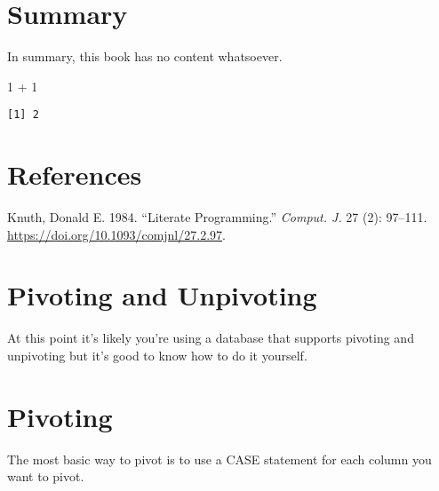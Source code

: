 \documentclass[
  letterpaper,
  DIV=11,
  numbers=noendperiod]{scrreprt}
\newenvironment{Shaded}{\begin{snugshade}}{\end{snugshade}}
\newcommand{\DecValTok}[1]{\textcolor[rgb]{0.68,0.00,0.00}{#1}}
\newcommand{\SpecialCharTok}[1]{\textcolor[rgb]{0.37,0.37,0.37}{#1}}
\newlength{\cslhangindent}
\newlength{\cslentryspacingunit} %
\newenvironment{CSLReferences}[2] %
 {%
  \setlength{\parindent}{0pt}
  \ifodd #1
  \let\oldpar\par
  \def\par{\hangindent=\cslhangindent\oldpar}
  \fi
  \setlength{\parskip}{#2\cslentryspacingunit}
 }%
 {}
\begin{document}
\hypertarget{summary}{%
\chapter{Summary}\label{summary}}

In summary, this book has no content whatsoever.

\begin{Shaded}
\begin{Highlighting}[]
\DecValTok{1} \SpecialCharTok{+} \DecValTok{1}
\end{Highlighting}
\end{Shaded}

\begin{verbatim}
[1] 2
\end{verbatim}


\hypertarget{references}{%
\chapter*{References}\label{references}}


\hypertarget{refs}{}
\begin{CSLReferences}{1}{0}
\leavevmode{}%
Knuth, Donald E. 1984. {``Literate Programming.''} \emph{Comput. J.} 27
(2): 97--111. \url{https://doi.org/10.1093/comjnl/27.2.97}.

\end{CSLReferences}


\hypertarget{pivoting-and-unpivoting}{%
\chapter{Pivoting and Unpivoting}\label{pivoting-and-unpivoting}}

At this point it's likely you're using a database that supports pivoting
and unpivoting but it's good to know how to do it yourself.


\hypertarget{pivoting}{%
\chapter{Pivoting}\label{pivoting}}

The most basic way to pivot is to use a CASE statement for each column
you want to pivot.
\end{document}
